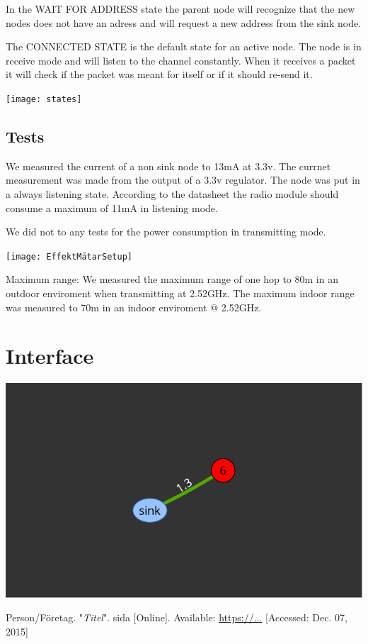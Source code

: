 \documentclass[a4paper,11pt]{article}
\begin{document}
In the WAIT FOR ADDRESS state the parent node will recognize that the
new nodes does not have an adress and will request a new address from
the sink node. 

The CONNECTED STATE is the default state for an active node. The node
is in receive mode and will listen to the channel constantly. When
it receives a packet it will check if the packet was meant for
itself or if it should re-send it.

\texttt{[image: states]}



\subsection{Tests}
We measured the current of a non sink node to 13mA at 3.3v. The
currnet measurement was made from the output of a 3.3v regulator. 
The node was put in a always listening state. According to the 
datasheet the radio module should consume a maximum of 11mA in
listening mode.

We did not to any tests for the power consumption in transmitting
mode.


\begin{center}
\texttt{[image: EffektMätarSetup]}
\end{center}

Maximum range:
We measured the maximum range of one hop to 80m in an outdoor 
enviroment when transmitting at 2.52GHz. 
The maximum indoor range was measured to 70m in an indoor
enviroment @ 2.52GHz.
 

\section{Interface}
\begin{center}
\includegraphics[width=.5\textwidth]{map}
\end{center}

\cite{label}

\begin{thebibliography}{2}

  Person/Företag. "\emph{Titel}". sida [Online]. Available: \url{https://...} [Accessed: Dec. 07, 2015]

\end{thebibliography}
\end{document}
